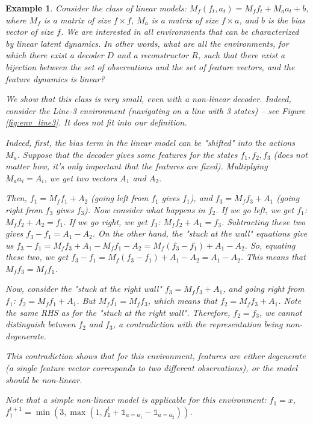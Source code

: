 \documentclass[a4paper,11pt,oneside]{report}
\newtheorem{example}{Example}[section]
\begin{document}
\begin{example}
    Consider the class of linear models: $M_f(f_t,a_t)=M_ff_t+M_aa_t+b$, where $M_f$ is a matrix of size $f\times f$, $M_a$ is a matrix of size $f\times a$, and $b$ is the bias vector of size $f$. We are interested in all environments that can be characterized by linear latent dynamics. In other words, what are all the environments, for which there exist a decoder $D$ and a reconstructor $R$, such that there exist a bijection between the set of observations and the set of feature vectors, and the feature dynamics is linear?

    We show that this class is very small, even with a non-linear decoder. Indeed, consider the Line-3 environment (navigating on a line with 3 states) -- see Figure \ref{fig:env_line3}. It does not fit into our definition.

    Indeed, first, the bias term in the linear model can be "shifted" into the actions $M_a$. Suppose that the decoder gives some features for the states $f_1, f_2, f_3$ (does not matter how, it's only important that the features are fixed). Multiplying $M_aa_i=A_i$, we get two vectors $A_1$ and $A_2$.

    Then, $f_1=M_ff_1+A_2$ (going left from $f_1$ gives $f_1$), and $f_3=M_ff_3+A_1$ (going right from $f_3$ gives $f_3$). Now consider what happens in $f_2$. If we go left, we get $f_1$: $M_ff_2+A_2=f_1$. If we go right, we get $f_3$: $M_ff_2+A_1=f_3$. Subtracting these two gives $f_3-f_1=A_1-A_2$. On the other hand, the "stuck at the wall" equations give us $f_3-f_1=M_ff_3+A_1-M_ff_1-A_2=M_f(f_3-f_1)+A_1-A_2$. So, equating these two, we get
    $f_3-f_1=M_f(f_3-f_1)+A_1-A_2=A_1-A_2$. This means that $M_ff_3=M_ff_1$.

    Now, consider the "stuck at the right wall" $f_3=M_ff_3+A_1$, and going right from $f_1$: $f_2=M_ff_1+A_1$. But $M_ff_1=M_ff_3$, which means that $f_2=M_ff_3+A_1$. Note the same RHS as for the "stuck at the right wall". Therefore, $f_2=f_3$, {\em we cannot distinguish between $f_2$ and $f_3$, a contradiction with the representation being non-degenerate.}

    This contradiction shows that for this environment, features are either {\em degenerate} (a single feature vector corresponds to two different observations), or the model should be non-linear.

    Note that a simple non-linear model is applicable for this environment:
    $f_1=x$, $f_1^{t+1}=\min(3, \max(1, f_1^t+\mathds 1_{a=a_1}-\mathds 1_{a=a_2}))$.
\end{example}
\end{document}
